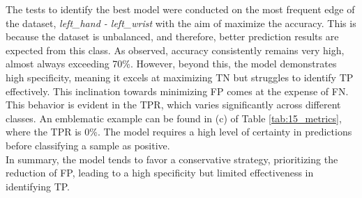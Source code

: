 The tests to identify the best model were conducted on the most frequent edge of the dataset, \textit{left\_hand - left\_wrist} with the aim of maximize the accuracy.
This is because the dataset is unbalanced, and therefore, better prediction results are expected from this class.
As observed, accuracy consistently remains very high, almost always exceeding 70\%.
However, beyond this, the model demonstrates high specificity, meaning it excels at maximizing TN but struggles to identify TP effectively.
This inclination towards minimizing FP comes at the expense of FN.
This behavior is evident in the TPR, which varies significantly across different classes.
An emblematic example can be found in (c) of Table \ref{tab:15_metrics}, where the TPR is 0\%.
The model requires a high level of certainty in predictions before classifying a sample as positive. \\
In summary, the model tends to favor a conservative strategy, prioritizing the reduction of FP, leading to a high specificity but limited effectiveness in identifying TP.


